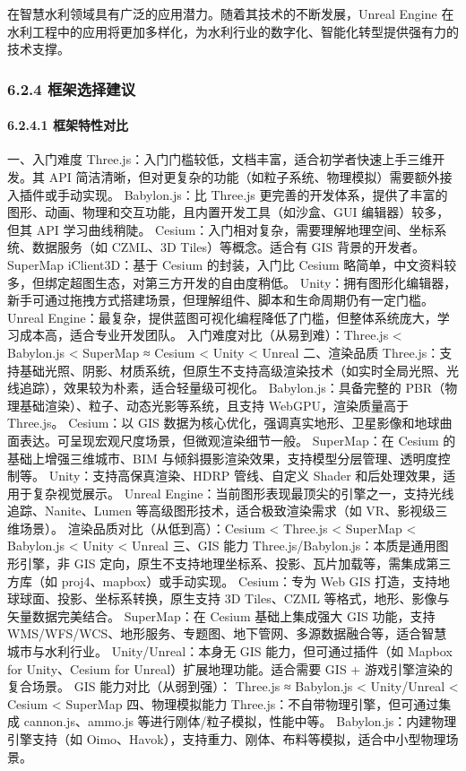 在智慧水利领域具有广泛的应用潜力。随着其技术的不断发展，Unreal Engine 在水利工程中的应用将更加多样化，为水利行业的数字化、智能化转型提供强有力的技术支撑。 \subsubsection{6.2.4 框架选择建议}\label{ux6846ux67b6ux9009ux62e9ux5efaux8bae} \paragraph{6.2.4.1 框架特性对比}\label{ux6846ux67b6ux7279ux6027ux5bf9ux6bd4} 一、入门难度 Three.js：入门门槛较低，文档丰富，适合初学者快速上手三维开发。其 API 简洁清晰，但对更复杂的功能（如粒子系统、物理模拟）需要额外接入插件或手动实现。 Babylon.js：比 Three.js 更完善的开发体系，提供了丰富的图形、动画、物理和交互功能，且内置开发工具（如沙盒、GUI 编辑器）较多，但其 API 学习曲线稍陡。 Cesium：入门相对复杂，需要理解地理空间、坐标系统、数据服务（如 CZML、3D Tiles）等概念。适合有 GIS 背景的开发者。 SuperMap iClient3D：基于 Cesium 的封装，入门比 Cesium 略简单，中文资料较多，但绑定超图生态，对第三方开发的自由度稍低。 Unity：拥有图形化编辑器，新手可通过拖拽方式搭建场景，但理解组件、脚本和生命周期仍有一定门槛。 Unreal Engine：最复杂，提供蓝图可视化编程降低了门槛，但整体系统庞大，学习成本高，适合专业开发团队。 入门难度对比（从易到难）：Three.js \textless{} Babylon.js \textless{} SuperMap ≈ Cesium \textless{} Unity \textless{} Unreal 二、渲染品质 Three.js：支持基础光照、阴影、材质系统，但原生不支持高级渲染技术（如实时全局光照、光线追踪），效果较为朴素，适合轻量级可视化。 Babylon.js：具备完整的 PBR（物理基础渲染）、粒子、动态光影等系统，且支持 WebGPU，渲染质量高于 Three.js。 Cesium：以 GIS 数据为核心优化，强调真实地形、卫星影像和地球曲面表达。可呈现宏观尺度场景，但微观渲染细节一般。 SuperMap：在 Cesium 的基础上增强三维城市、BIM 与倾斜摄影渲染效果，支持模型分层管理、透明度控制等。 Unity：支持高保真渲染、HDRP 管线、自定义 Shader 和后处理效果，适用于复杂视觉展示。 Unreal Engine：当前图形表现最顶尖的引擎之一，支持光线追踪、Nanite、Lumen 等高级图形技术，适合极致渲染需求（如 VR、影视级三维场景）。 渲染品质对比（从低到高）：Cesium \textless{} Three.js \textless{} SuperMap \textless{} Babylon.js \textless{} Unity \textless{} Unreal 三、GIS 能力 Three.js/Babylon.js：本质是通用图形引擎，非 GIS 定向，原生不支持地理坐标系、投影、瓦片加载等，需集成第三方库（如 proj4、mapbox）或手动实现。 Cesium：专为 Web GIS 打造，支持地球球面、投影、坐标系转换，原生支持 3D Tiles、CZML 等格式，地形、影像与矢量数据完美结合。 SuperMap：在 Cesium 基础上集成强大 GIS 功能，支持 WMS/WFS/WCS、地形服务、专题图、地下管网、多源数据融合等，适合智慧城市与水利行业。 Unity/Unreal：本身无 GIS 能力，但可通过插件（如 Mapbox for Unity、Cesium for Unreal）扩展地理功能。适合需要 GIS + 游戏引擎渲染的复合场景。 GIS 能力对比（从弱到强）： Three.js ≈ Babylon.js \textless{} Unity/Unreal \textless{} Cesium \textless{} SuperMap 四、物理模拟能力 Three.js：不自带物理引擎，但可通过集成 cannon.js、ammo.js 等进行刚体/粒子模拟，性能中等。 Babylon.js：内建物理引擎支持（如 Oimo、Havok），支持重力、刚体、布料等模拟，适合中小型物理场景。 